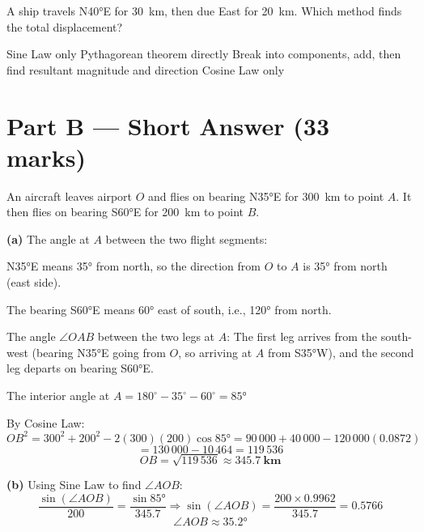 \documentclass[addpoints]{exam}
\begin{document}
\begin{questions}
\question[1] A ship travels N\ang{40}E for \SI{30}{km}, then due East for \SI{20}{km}.
Which method finds the total displacement?
\begin{choices}
    \choice Sine Law only
    \choice Pythagorean theorem directly
    \correctchoice Break into components, add, then find resultant magnitude and direction
    \choice Cosine Law only
\end{choices}


\section*{Part B --- Short Answer (33 marks)}

\question[5] An aircraft leaves airport $O$ and flies on bearing N\ang{35}E for \SI{300}{km}
to point $A$. It then flies on bearing S\ang{60}E for \SI{200}{km} to point $B$.
\begin{solution}[10cm]
\textbf{(a)} The angle at $A$ between the two flight segments:

N\ang{35}E means \ang{35} from north, so the direction from $O$ to $A$ is \ang{35} from north (east side).

The bearing S\ang{60}E means \ang{60} east of south, i.e., \ang{120} from north.

The angle $\angle OAB$ between the two legs at $A$:
The first leg arrives from the south-west (bearing N\ang{35}E going from $O$, so arriving at $A$ from S\ang{35}W), and the second leg departs on bearing S\ang{60}E.

The interior angle at $A = 180^\circ - 35^\circ - 60^\circ = \ang{85}$

By Cosine Law:
\[OB^2 = 300^2 + 200^2 - 2(300)(200)\cos\ang{85} = 90\,000 + 40\,000 - 120\,000(0.0872)\]
\[= 130\,000 - 10\,464 = 119\,536\]
\[OB = \sqrt{119\,536} \approx \mathbf{\SI{345.7}{km}}\]

\textbf{(b)} Using Sine Law to find $\angle AOB$:
\[\frac{\sin(\angle AOB)}{200} = \frac{\sin\ang{85}}{345.7} \Rightarrow \sin(\angle AOB) = \frac{200 \times 0.9962}{345.7} = 0.5766\]
\[\angle AOB \approx \ang{35.2}\]


\end{solution}
\end{questions}
\end{document}
